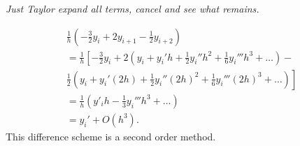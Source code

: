 \documentclass[12pt]{article}
\begin{document}
\begin{enumerate}
{\em
Just Taylor expand all terms, cancel and see what remains.

\begin{multline*}
\frac{1}{h} \left( -\frac{3}{2} y_i + 2 y_{i+1} -
\frac{1}{2} y_{i+2}\right) \\ 
= \frac{1}{h} \left[ -\frac{3}{2} y_i + 
2 \left(y_{i} + y_i' h + \frac{1}{2} y_i'' h^2 + \frac{1}{6} y_i''' h^3 + \ldots \right)- \right. \\
\left. \frac{1}{2} \left(y_i + y_i' (2 h) + \frac{1}{2} y_i'' (2h)^2 + \frac{1}{6} y_i''' (2h)^3 + \ldots\right)\right] \\
= \frac{1}{h} \left( y'_i h  - \frac{1}{3} y_i''' h^3 + \ldots\right) \\
= y_i' + O(h^3).
\end{multline*}
This difference scheme is a second order method.
}

\end{enumerate}
\end{document}
